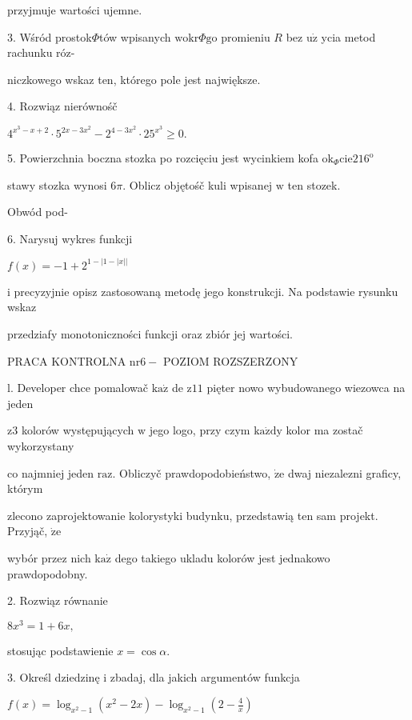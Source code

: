 \documentclass[a4paper,12pt]{article}
\begin{document}
przyjmuje wartości ujemne.

3. Wśród prostok$\Phi$tów wpisanych $\mathrm{w}\mathrm{o}\mathrm{k}\mathrm{r}\Phi \mathrm{g}\mathrm{o}$ promieniu $R$ bez $\mathrm{u}\dot{\mathrm{z}}$ ycia metod rachunku róz-

niczkowego wskaz ten, którego pole jest największe.

4. Rozwiąz nierównośč

$4^{x^{3}-x+2}\cdot 5^{2x-3x^{2}}-2^{4-3x^{2}}\cdot 25^{x^{3}}\geq 0.$

5. Powierzchnia boczna stozka po rozcięciu jest wycinkiem kofa $\mathrm{o}\mathrm{k}_{\Phi}\mathrm{c}\mathrm{i}\mathrm{e}216^{\mathrm{o}}$

stawy stozka wynosi $ 6\pi$. Oblicz objętośč kuli wpisanej $\mathrm{w}$ ten stozek.

Obwód pod-

6. Narysuj wykres funkcji

$f(x)=-1+2^{1-|1-|x||}$

i precyzyjnie opisz zastosowaną metodę jego konstrukcji. Na podstawie rysunku wskaz

przedziafy monotoniczności funkcji oraz zbiór jej wartości.




PRACA KONTROLNA $\mathrm{n}\mathrm{r} 6-$ POZIOM ROZSZERZONY

l. Developer chce pomalowač $\mathrm{k}\mathrm{a}\dot{\mathrm{z}}$ de $\mathrm{z} 11$ pięter nowo wybudowanego wiezowca na jeden

$\mathrm{z}3$ kolorów występujących $\mathrm{w}$ jego logo, przy czym $\mathrm{k}\mathrm{a}\dot{\mathrm{z}}\mathrm{d}\mathrm{y}$ kolor ma zostač wykorzystany

co najmniej jeden $\mathrm{r}\mathrm{a}\mathrm{z}$. Obliczyč prawdopodobieństwo, $\dot{\mathrm{z}}\mathrm{e}$ dwaj niezalezni graficy, którym

zlecono zaprojektowanie kolorystyki budynku, przedstawią ten sam projekt. Przyjąč, $\dot{\mathrm{z}}\mathrm{e}$

wybór przez nich $\mathrm{k}\mathrm{a}\dot{\mathrm{z}}$ dego takiego ukladu kolorów jest jednakowo prawdopodobny.

2. Rozwiąz równanie

$8x^{3}=1+6x,$

stosując podstawienie $x=\cos\alpha.$

3. Określ dziedzinę $\mathrm{i}$ zbadaj, dla jakich argumentów funkcja

$f(x)=\displaystyle \log_{x^{2}-1}(x^{2}-2x)-\log_{x^{2}-1}(2-\frac{4}{x})$
\end{document}
